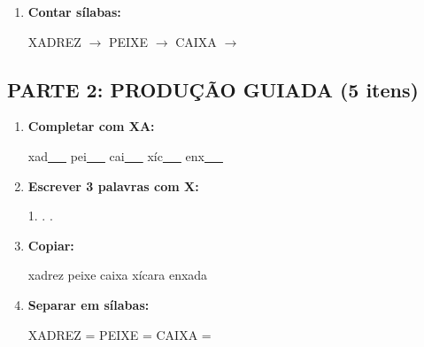 \begin{exercicio}
\begin{enumerate}
  \item \textbf{Contar sílabas:}
  \begin{center}
  XADREZ $\rightarrow$ \underline{\hspace{0.9cm}} \quad PEIXE $\rightarrow$ \underline{\hspace{0.9cm}} \quad CAIXA $\rightarrow$ \underline{\hspace{0.9cm}}
  \end{center}

\end{enumerate}

\subsection*{PARTE 2: PRODUÇÃO GUIADA (5 itens)}

\begin{enumerate}[resume]

  \item \textbf{Completar com XA:}
  \begin{center}
  xad\underline{~~~} \quad pei\underline{~~~} \quad cai\underline{~~~} \quad xíc\underline{~~~} \quad enx\underline{~~~}
  \end{center}

  \item \textbf{Escrever 3 palavras com X:}
  \begin{center}
  1. \underline{\hspace{3cm}} . \underline{\hspace{3cm}} . \underline{\hspace{3cm}}
  \end{center}

  \item \textbf{Copiar:}
  \begin{center}
  xadrez \quad peixe \quad caixa \quad xícara \quad enxada
  \end{center}

  \item \textbf{Separar em sílabas:}
  \begin{center}
  XADREZ = \underline{\hspace{1cm}} \underline{\hspace{1cm}} \quad PEIXE = \underline{\hspace{1cm}} \underline{\hspace{1cm}} \quad CAIXA = \underline{\hspace{1cm}} \underline{\hspace{1cm}}
  \end{center}


\end{enumerate}
\end{exercicio}
